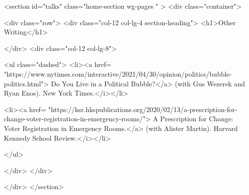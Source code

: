   <section id="talks" class="home-section wg-pages   "  >
    <div class="container">











































<div class="row">
  <div class="col-12 col-lg-4 section-heading">
    <h1>Other Writing</h1>

  </div>
  <div class="col-12 col-lg-8">

    <ul class="dashed">
  <li><a href= "https://www.nytimes.com/interactive/2021/04/30/opinion/politics/bubble-politics.html"> Do You Live in a Political Bubble?</a> (with Gus Wezerek and Ryan Enos). New York Times.</i></li>

  <li><a href= "https://ksr.hkspublications.org/2020/02/13/a-prescription-for-change-voter-registration-in-emergency-rooms/"> A Prescription for Change: Voter Registration in Emergency Rooms.</a> (with Alister Martin). Harvard Kennedy School Review.</i></li>

</ul>






  </div>
</div>

    </div>
  </section>































